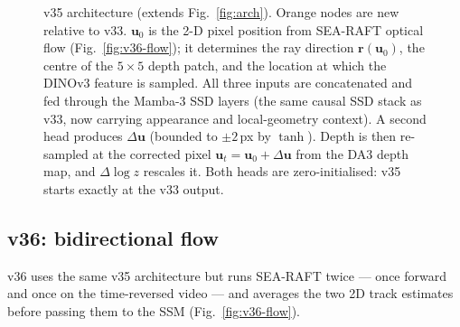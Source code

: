 \documentclass[11pt,a4paper]{article}
\begin{document}
\begin{figure}[h]
\caption{v35 architecture (extends Fig.~\ref{fig:arch}).
\textcolor{orange!80!black}{Orange} nodes are new relative to v33.
$\mathbf{u}_0$ is the 2-D pixel position from SEA-RAFT optical flow (Fig.~\ref{fig:v36-flow});
it determines the ray direction $\mathbf{r}(\mathbf{u}_0)$, the centre of the $5{\times}5$ depth
patch, and the location at which the DINOv3 feature is sampled.
All three inputs are concatenated and fed through the Mamba-3 SSD layers (the same
causal SSD stack as v33, now carrying appearance and local-geometry context).
A second head produces $\Delta\mathbf{u}$ (bounded to $\pm 2$\,px by $\tanh$).
Depth is then re-sampled at the corrected pixel $\mathbf{u}_t = \mathbf{u}_0 + \Delta\mathbf{u}$
from the DA3 depth map, and $\Delta\!\log z$ rescales it.
Both heads are zero-initialised: v35 starts exactly at the v33 output.}
\label{fig:v35-arch}
\end{figure}

\subsection{v36: bidirectional flow}
\label{sec:v36}

v36 uses the same v35 architecture but runs SEA-RAFT twice --- once forward and once on the
time-reversed video --- and averages the two 2D track estimates before passing them to the SSM
(Fig.~\ref{fig:v36-flow}).
\end{document}
